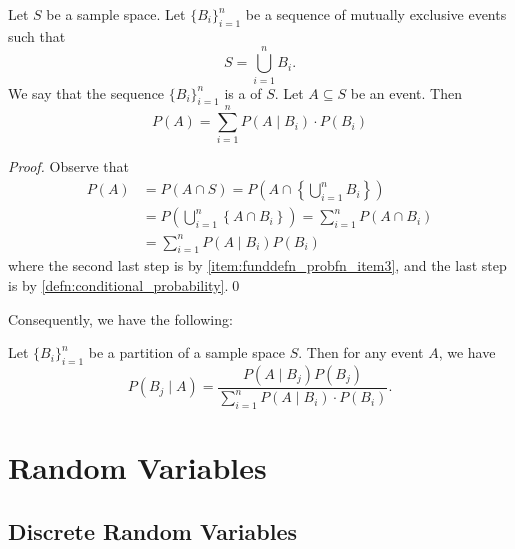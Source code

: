 \documentclass[notoc,notitlepage]{tufte-book}
\begin{document}
\begin{thm}
\label{thm:law_of_total_probability}
  Let $S$ be a sample space. Let $\{ B_i \}_{i = 1}^{n}$ be a sequence of mutually exclusive events such that
  \begin{equation*}
    S = \bigcup_{i=1}^{n} B_i.
  \end{equation*}
  We say that the sequence $\{ B_i \}_{i = 1}^{n}$ is a  of $S$. Let $A \subseteq S$ be an event. Then
  \begin{equation*}
    P(A) = \sum_{i=1}^{n} P(A \mid B_i) \cdot P(B_i)
  \end{equation*}
\end{thm}

\begin{proof}
  Observe that
  \begin{align*}
    P(A) &= P(A \cap S) = P\left( A \cap \left\{ \bigcup_{i=1}^{n} B_i  \right\} \right) \\
         &= P\left( \bigcup_{i=1}^{n} \left\{ A \cap B_i \right\} \right) = \sum_{i=1}^{n} P(A \cap B_i) \\
         &= \sum_{i=1}^{n} P(A \mid B_i) P(B_i)
  \end{align*}
  where the second last step is by \cref{item:funddefn_probfn_item3}, and the last step is by \cref{defn:conditional_probability}.\qed
\end{proof}

Consequently, we have the following:

\begin{crly}
\label{crly:bayes_formula}
  Let $\{ B_i \}_{i = 1}^{n}$ be a partition of a sample space $S$. Then for any event $A$, we have
  \begin{equation*}
    P(B_j \mid A) = \frac{P(A \mid B_j) P(B_j)}{\sum_{i=1}^{n} P(A \mid B_i) \cdot P(B_i)}.
  \end{equation*}
\end{crly}


\section{Random Variables}%
\label{sec:random_variables}

\subsection{Discrete Random Variables}%
\label{sub:discrete_random_variables}
\end{document}
